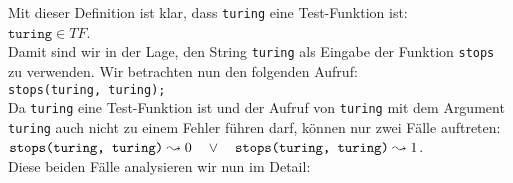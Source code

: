 Mit dieser Definition ist klar, dass \texttt{turing} eine Test-Funktion ist: \\[0.3cm]
\hspace*{1.3cm} $\texttt{turing} \in T\!F$. \\[0.3cm]
Damit sind wir in der Lage, den String \texttt{turing} als Eingabe der Funktion \texttt{stops}
zu verwenden.  Wir betrachten nun den folgenden Aufruf: \\[0.3cm]
\hspace*{1.3cm} \texttt{stops(\texttt{turing}, \texttt{turing});} \\[0.3cm]
Da \texttt{turing} eine Test-Funktion ist und der Aufruf von \texttt{turing} mit dem Argument \texttt{turing}
auch nicht zu einem Fehler führen darf, können nur zwei Fälle auftreten:
\\[0.1cm]
\hspace*{1.3cm} 
$\texttt{stops(\texttt{turing}, \texttt{turing})} \leadsto 0 \quad \vee\quad
 \texttt{stops(\texttt{turing}, \texttt{turing})} \leadsto 1$. \\[0.1cm]
Diese beiden Fälle analysieren wir nun im Detail:

